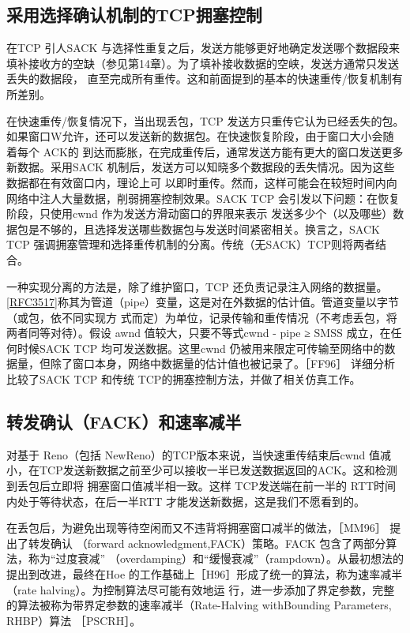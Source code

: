 \subsection{采用选择确认机制的TCP拥塞控制}
在TCP 引人SACK 与选择性重复之后，发送方能够更好地确定发送哪个数据段来填补接收方的空缺（参见第14章）。为了填补接收数据的空峡，发送方通常只发送丢失的数据段，
直至完成所有重传。这和前面提到的基本的快速重传/恢复机制有所差别。

在快速重传/恢复情况下，当出现丢包，TCP 发送方只重传它认为已经丢失的包。如果窗口W允许，还可以发送新的数据包。在快速恢复阶段，由于窗口大小会随着每个 ACK的
到达而膨胀，在完成重传后，通常发送方能有更大的窗口发送更多新数据。采用SACK 机制后，发送方可以知晓多个数据段的丢失情况。因为这些数据都在有效窗口内，理论上可
以即时重传。然而，这样可能会在较短时间内向网络中注人大量数据，削弱拥塞控制效果。SACK TCP 会引发以下问题：在恢复阶段，只使用cwnd 作为发送方滑动窗口的界限来表示
发送多少个（以及哪些）数据包是不够的，且选择发送哪些数据包与发送时间紧密相关。换言之，SACK TCP 强调拥塞管理和选择重传机制的分离。传统（无SACK）TCP则将两者结合。

一种实现分离的方法是，除了维护窗口，TCP 还负责记录注入网络的数据量。\href{https://www.rfc-editor.org/rfc/rfc3517}{[RFC3517]}称其为管道（pipe）变量，这是对在外数据的估计值。管道变量以字节（或包，依不同实现方
式而定）为单位，记录传输和重传情况（不考虑丢包，将两者同等对待）。假设 awnd 值较大，只要不等式cwnd - pipe ≥ SMSS 成立，在任何时候SACK TCP 均可发送数据。这里cwnd
仍被用来限定可传输至网络中的数据量，但除了窗口本身，网络中数据量的估计值也被记录了。［FF96］ 详细分析比较了SACK TCP 和传统 TCP的拥塞控制方法，并做了相关仿真工作。

\subsection{转发确认（FACK）和速率减半}
对基于 Reno（包括 NewReno）的TCP版本来说，当快速重传结束后cwnd 值减小，在TCP发送新数据之前至少可以接收一半已发送数据返回的ACK。这和检测到丢包后立即将
拥塞窗口值减半相一致。这样 TCP发送端在前一半的 RTT时间内处于等待状态，在后一半RTT 才能发送新数据，这是我们不愿看到的。

在丢包后，为避免出现等待空闲而又不违背将拥塞窗口减半的做法，［MM96］ 提出了转发确认 （forward acknowledgment,FACK）策略。FACK 包含了两部分算法，称为“过度衰减”
（overdamping）和“缓慢衰减”（rampdown）。从最初想法的提出到改进，最终在Hoe 的工作基础上［H96］形成了统一的算法，称为速率减半（rate halving）。为控制算法尽可能有效地运
行，进一步添加了界定参数，完整的算法被称为带界定参数的速率减半（Rate-Halving withBounding Parameters, RHBP）算法 ［PSCRH］。

